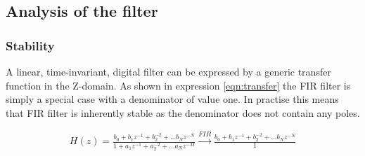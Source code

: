 
\subsection{Analysis of the filter}

\subsubsection{Stability}
A linear, time-invariant, digital filter can be expressed by a generic transfer function in the Z-domain. As shown in expression \cref{eqn:transfer} the FIR filter is simply a special case with a denominator of value one. In practise this means that FIR filter is inherently stable as the denominator does not contain any poles.

\begin{align}
H(z)=\frac{b_0+b_1z^{-1}+b_2^{-2}+...b_Nz^{-N}}{1+a_1z^{-1}+a_2^{-2}+...a_Nz^{-M}} \xrightarrow[]{FIR}  \frac{b_0+b_1z^{-1}+b_2^{-2}+...b_Nz^{-N}}{1}
\label{eqn:transfer}
\end{align}
